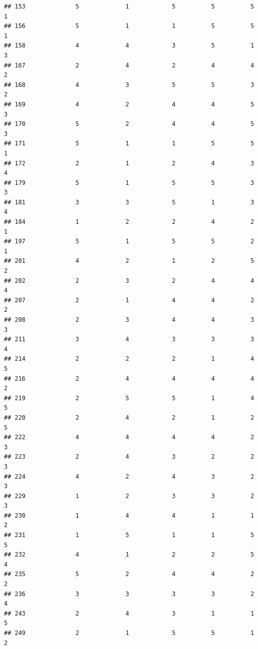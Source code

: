 \documentclass[
]{article}
\begin{document}
\begin{verbatim}
## 153              5             1            5          5          5        1
## 156              5             1            1          5          5        1
## 158              4             4            3          5          1        3
## 167              2             4            2          4          4        2
## 168              4             3            5          5          3        2
## 169              4             2            4          4          5        3
## 170              5             2            4          4          5        3
## 171              5             1            1          5          5        1
## 172              2             1            2          4          3        4
## 179              5             1            5          5          3        3
## 181              3             3            5          1          3        4
## 184              1             2            2          4          2        1
## 197              5             1            5          5          2        1
## 201              4             2            1          2          5        2
## 202              2             3            2          4          4        4
## 207              2             1            4          4          2        2
## 208              2             3            4          4          3        3
## 211              3             4            3          3          3        4
## 214              2             2            2          1          4        5
## 216              2             4            4          4          4        2
## 219              2             5            5          1          4        5
## 220              2             4            2          1          2        5
## 222              4             4            4          4          2        3
## 223              2             4            3          2          2        3
## 224              4             2            4          3          2        3
## 229              1             2            3          3          2        3
## 230              1             4            4          1          1        2
## 231              1             5            1          1          5        5
## 232              4             1            2          2          5        4
## 235              5             2            4          4          2        2
## 236              3             3            3          3          2        4
## 243              2             4            3          1          1        5
## 249              2             1            5          5          1        2

\end{verbatim}
\end{document}
